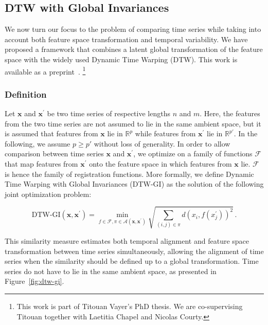 \subsection{DTW with Global Invariances}
\label{sec:dtw_gi}

We now turn our focus to the problem of comparing time series while taking
into account both feature space transformation and temporal variability.
We have proposed a framework that combines a latent global transformation of
the feature
space with the widely used Dynamic Time Warping (DTW).
This work is available as a preprint~\cite{vayer2020time}.%
\footnote{\label{fn:titouan}This work is part of Titouan Vayer's PhD thesis.
We are co-supervising Titouan together with Laetitia Chapel and Nicolas Courty.}

\subsubsection{Definition}

Let $\mathbf{x}$ and $\mathbf{x^\prime}$ be two time series of respective
lengths $n$ and $m$.
Here, the features from the two time series are not assumed to lie in the same
ambient
space, but it is assumed that features from $\mathbf{x}$ lie in $\mathbb{R}^p$
while features from $\mathbf{x^\prime}$ lie in $\mathbb{R}^{p'}$.
In the following, we assume $p \geq p'$ without loss of generality.
In order to allow comparison between time series $\mathbf{x}$ and
$\mathbf{x^\prime}$,
we optimize on a family of functions $\mathcal{F}$ that map features from
$\mathbf{x^\prime}$ onto the feature space in which features from $\mathbf{x}$
lie. $\mathcal{F}$ is hence the family of registration functions.
More formally, we define Dynamic Time Warping with Global Invariances
(DTW-GI) as the solution of the following joint optimization problem:

\begin{equation}
    \text{DTW-GI}(\mathbf{x}, \mathbf{x^\prime}) =
        \min_{f \in \mathcal{F}, \pi \in \mathcal{A}(\mathbf{x}, \mathbf{x^\prime})}
            \sqrt{ \sum_{(i, j) \in \pi} d(x_i, f(x^\prime_j))^2 } \, .
    \label{eq:dtwgi}
\end{equation}


This similarity measure estimates both temporal alignment and feature space
transformation between time series simultaneously, allowing the alignment of
time series when the similarity should be defined up to a global transformation.
Time series do not have to lie in the same ambient space, as presented in
Figure~\ref{fig:dtw-gi}.

